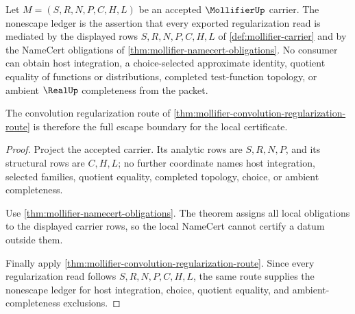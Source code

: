 \begin{theorem}
\label{thm:mollifier-nonescape-ledger-obligation}
Let $M=(S,R,N,P,C,H,L)$ be an accepted $\MollifierUp$ carrier. The nonescape ledger is the assertion that every exported regularization read is mediated by the displayed rows $S,R,N,P,C,H,L$ of \autoref{def:mollifier-carrier} and by the NameCert obligations of \autoref{thm:mollifier-namecert-obligations}. No consumer can obtain host integration, a choice-selected approximate identity, quotient equality of functions or distributions, completed test-function topology, or ambient $\RealUp$ completeness from the packet.

The convolution regularization route of \autoref{thm:mollifier-convolution-regularization-route} is therefore the full escape boundary for the local certificate.
\end{theorem}
\begin{proof}
Project the accepted carrier. Its analytic rows are $S,R,N,P$, and its structural rows are $C,H,L$; no further coordinate names host integration, selected families, quotient equality, completed topology, choice, or ambient completeness.

Use \autoref{thm:mollifier-namecert-obligations}. The theorem assigns all local obligations to the displayed carrier rows, so the local NameCert cannot certify a datum outside them.

Finally apply \autoref{thm:mollifier-convolution-regularization-route}. Since every regularization read follows $S,R,N,P,C,H,L$, the same route supplies the nonescape ledger for host integration, choice, quotient equality, and ambient-completeness exclusions.
\end{proof}

